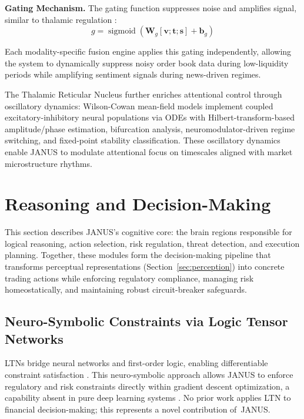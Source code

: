 \documentclass[12pt, a4paper]{article}
\DeclareMathOperator{\sigmoid}{sigmoid}
\begin{document}
\textbf{Gating Mechanism.}
The gating function suppresses noise and amplifies signal, similar to thalamic regulation \citep{halassa2017thalamic}:
\begin{equation}
	g = \sigmoid(\mathbf{W}_g[\mathbf{v}; \mathbf{t}; \mathbf{s}] + \mathbf{b}_g)
\end{equation}

Each modality-specific fusion engine applies this gating independently, allowing the system to dynamically suppress noisy order book data during low-liquidity periods while amplifying sentiment signals during news-driven regimes.

The Thalamic Reticular Nucleus further enriches attentional control through oscillatory dynamics: Wilson-Cowan mean-field models \citep{wilson1972excitatory, wilson2024bidirectional} implement coupled excitatory-inhibitory neural populations via ODEs with Hilbert-transform-based amplitude/phase estimation, bifurcation analysis, neuromodulator-driven regime switching, and fixed-point stability classification. These oscillatory dynamics enable JANUS to modulate attentional focus on timescales aligned with market microstructure rhythms.
\section{Reasoning and Decision-Making}
\label{sec:reasoning}

This section describes JANUS's cognitive core: the brain regions responsible for logical reasoning, action selection, risk regulation, threat detection, and execution planning.
Together, these modules form the decision-making pipeline that transforms perceptual representations (Section~\ref{sec:perception}) into concrete trading actions while enforcing regulatory compliance, managing risk homeostatically, and maintaining robust circuit-breaker safeguards.

\subsection{Neuro-Symbolic Constraints via Logic Tensor Networks}
\label{sec:ltn}

LTNs bridge neural networks and first-order logic, enabling differentiable constraint satisfaction \citep{badreddine2022logic, serafini2016ltn}.
This neuro-symbolic approach allows JANUS to enforce regulatory and risk constraints directly within gradient descent optimization, a capability absent in pure deep learning systems \citep{marra2024neurosymbolic, garcez2023neurosymbolic}.
No prior work applies LTN to financial decision-making; this represents a novel contribution of~JANUS.
\end{document}

